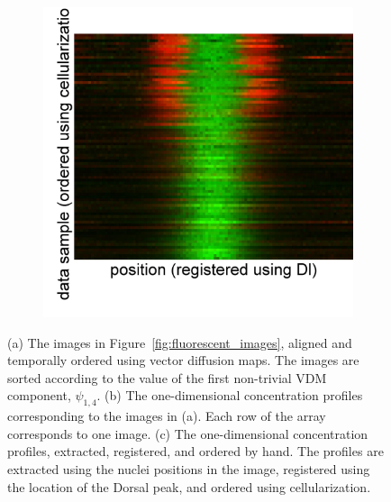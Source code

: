 \documentclass{pnastwo}
\begin{document}
\begin{figure}
\begin{minipage}{0.3\textwidth}
\begin{subfigure}{\textwidth}
\caption{}
\label{subfig:1dprofiles_vdm}
\end{subfigure}
\begin{subfigure}{\textwidth}
\includegraphics[width=\textwidth]{registered_ordered_hand}
\caption{}
\label{subfig:1dprofiles_hand}
\end{subfigure}
\end{minipage}
\caption{(a) The images in Figure~\ref{fig:fluorescent_images}, aligned and temporally ordered using vector diffusion maps. The images are sorted according to the value of the first non-trivial VDM component, $\psi_{1, 4}$. (b) The one-dimensional concentration profiles corresponding to the images in (a). Each row of the array corresponds to one image. (c) The one-dimensional concentration profiles, extracted, registered, and ordered by hand. The profiles are extracted using the nuclei positions in the image, registered using the location of the Dorsal peak, and ordered using cellularization. }
\end{figure}
\end{document}
